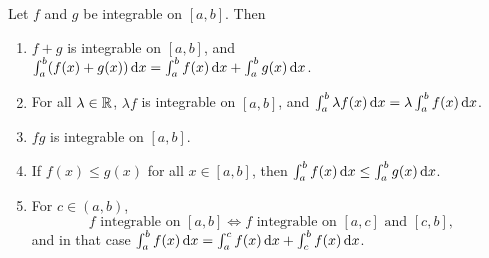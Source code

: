 \documentclass[../analysis1.tex]{subfiles}
\begin{document}
\begin{theorem}
\label{thm:aoi}
    \begin{shaded*}
        Let $f$ and $g$ be integrable on $[a,b]$. Then
        \begin{enumerate}
            \item $f+g$ is integrable on $[a,b]$, and $\int_a^b ( f(x) + g(x)) \d{x} = \int_a^b f(x) \d{x} + \int_a^b g(x) \d{x}$.
            \item For all $\lambda\in\mathbb{R}$, $\lambda f$ is integrable on $[a,b]$, and $\int_a^b \lambda f(x)\d{x} = \lambda\int_a^b f(x)\d{x}$.
            \item $fg$ is integrable on $[a,b]$. 
            \item If $f(x) \le g(x)$ for all $x \in [a,b]$, then $\int_a^b f(x) \d{x} \le \int_a^b g(x) \d{x}$.
            \item For $c \in (a,b)$,
            \[f\text{ integrable on }[a,b]\iff f\text{ integrable on }[a,c]\text{ and }[c,b],\]
            and in that case $\int_a^b f(x) \d{x} = \int_a^c f(x) \d{x} + \int_c^b f(x) \d{x}$.
        \end{enumerate}
    \end{shaded*}
\end{theorem}
\end{document}
